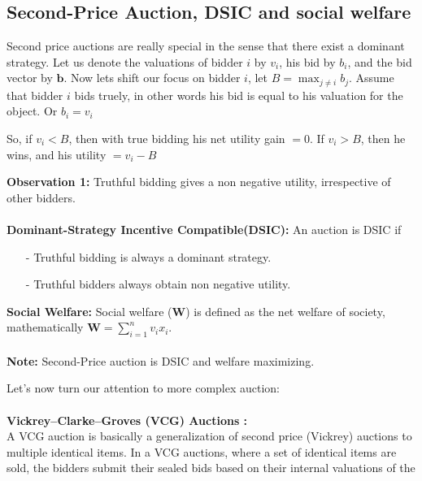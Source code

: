 \documentclass[a4paper]{article}
\begin{document}
\subsection*{Second-Price Auction, DSIC and social welfare}
Second price auctions are really special in the sense that there exist a dominant strategy.
Let us denote the valuations of bidder $i$ by $v_i$, his bid by $b_i$, and the bid vector by $\mathbf{b}$. Now lets shift our focus on bidder $i$, let $B = \max_{j\ne i} b_j$. 
Assume that bidder $i$ bids truely, in other words his bid is equal to his valuation for the object. Or $b_i = v_i$

So, if $v_i < B$, then with true bidding his net utility gain $= 0$. If $v_i > B$, then he wins, and his utility $= v_i - B$

\textbf{Observation 1:} Truthful bidding gives a non negative utility, irrespective of other bidders.  \\ \\
\textbf{Dominant-Strategy Incentive Compatible(DSIC):} An auction is DSIC if
\begin{itemize}
    \item[-] Truthful bidding is always a dominant strategy.
    \item[-] Truthful bidders always obtain non negative utility.
\end{itemize}
\textbf{Social Welfare:} Social welfare ($\mathbf{W}$) is defined as the net welfare of society, mathematically $\mathbf{W} = \sum_{i=1}^{n}v_i x_i$. \\ \\
\textbf{Note:} Second-Price auction is DSIC and welfare maximizing.


\pagebreak
Let's now turn our attention to more complex auction: \\ \\
\textbf{ Vickrey–Clarke–Groves (VCG) Auctions :}\\

A VCG auction is basically a generalization of second price (Vickrey) auctions to multiple identical items. In a VCG auctions, where a set of identical items are sold, the bidders submit their sealed bids based on their internal valuations of the 
\end{document}
